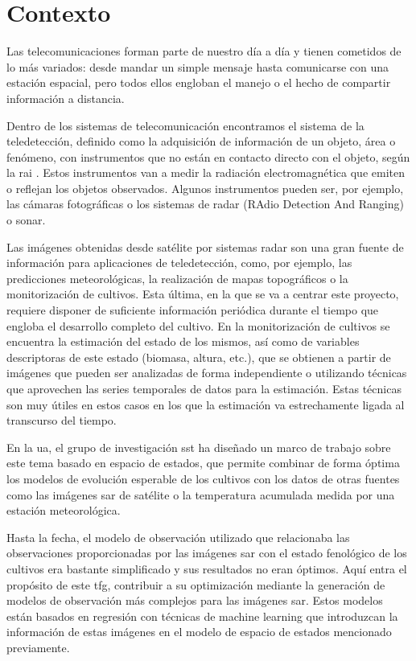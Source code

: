 \section{Contexto}
\par Las telecomunicaciones forman parte de nuestro día a día y tienen cometidos de lo más variados: desde mandar un simple mensaje hasta comunicarse con una estación espacial, pero todos ellos engloban el manejo o el hecho de compartir información a distancia. 
\\
\par Dentro de los sistemas de telecomunicación encontramos el sistema de la teledetección, definido como la adquisición de información de un objeto, área o fenómeno, con instrumentos que no están en contacto directo con el objeto, según la \gls{rai} \cite{RAI}. Estos instrumentos van a medir la radiación electromagnética que emiten o reflejan los objetos observados. Algunos instrumentos pueden ser, por ejemplo, las cámaras fotográficas o los sistemas de radar (RAdio Detection And Ranging) o sonar.
\\
\par Las imágenes obtenidas desde satélite por sistemas radar son una gran fuente de información para aplicaciones de teledetección, como, por ejemplo, las predicciones meteorológicas, la realización de mapas topográficos o la monitorización de cultivos. Esta última, en la que se va a centrar este proyecto, requiere disponer de suficiente información periódica durante el tiempo que engloba el desarrollo completo del cultivo. En la monitorización de cultivos se encuentra la estimación del estado de los mismos, así como de variables descriptoras de este estado (biomasa, altura, etc.), que se obtienen a partir de imágenes que pueden ser analizadas de forma independiente o utilizando técnicas que aprovechen las series temporales de datos para la estimación. Estas técnicas son muy útiles en estos casos en los que la estimación va estrechamente ligada al transcurso del tiempo. 
\\
\par En la \gls{ua}, el grupo de investigación \gls{sst} ha diseñado un marco de trabajo sobre este tema basado en espacio de estados, que permite combinar de forma óptima los modelos de evolución esperable de los cultivos con los datos de otras fuentes como las imágenes \gls{sar} de satélite o la temperatura acumulada medida por una estación meteorológica. 
\\
\par Hasta la fecha, el modelo de observación utilizado que relacionaba las observaciones proporcionadas por las imágenes \gls{sar} con el estado fenológico de los cultivos era bastante simplificado y sus resultados no eran óptimos. Aquí entra el propósito de este \gls{tfg}, contribuir a su optimización mediante la generación de modelos de observación más complejos para las imágenes \gls{sar}. Estos modelos están basados en regresión con técnicas de machine learning que introduzcan la información de estas imágenes en el modelo de espacio de estados mencionado previamente. 

